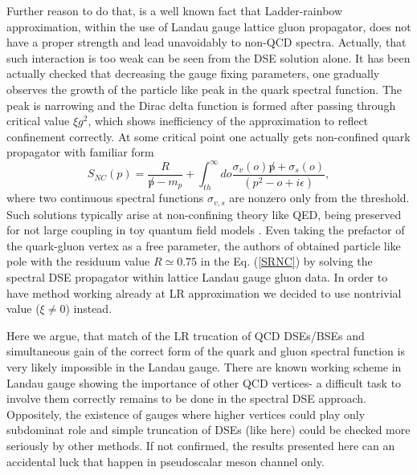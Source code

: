 \documentclass[aps,prd,superscriptaddress,eqsecnum,amsfonts,showpacs,epsfig]{revtex4}
\newcommand{\be}{\begin{equation}}
\newcommand{\ee}{\end{equation}}
\newcommand{\ep}{i\epsilon}
\begin{document}
 Further reason to do that, is a well known fact that Ladder-rainbow approximation, within the use of Landau gauge  lattice gluon propagator,
 does not have a proper strength and lead unavoidably to non-QCD spectra. Actually, that such interaction is too weak   can be  seen  from the DSE solution alone.  It has been actually  checked that  decreasing the gauge  fixing parameters, one gradually observes the growth of the particle like peak in the quark spectral function. The peak is narrowing and the Dirac delta function is formed  after passing through critical value $\xi g^2$, which shows  inefficiency
of  the approximation to reflect confinement correctly.
  At some critical point one actually gets non-confined quark  propagator with familiar form
%
\be \label{SRNC}
S_{NC}(p)=\frac{R}{\not p-m_p}+\int_{th}^{\infty} do \frac{\sigma_v(o)\not p+\sigma_s(o)}{(p^2-o+\ep)}, 
\ee
where two  continuous spectral functions  $\sigma_{v,s}$ are nonzero only from the threshold. 
 Such solutions typically arise at non-confining theory like QED, being 
preserved for not large coupling in toy quantum field models \cite{SAJHP2003}.
Even taking the prefactor of the quark-gluon vertex as a free parameter, the authors of  \cite{HPW2022b}  obtained particle like pole with the residuum value $R\simeq 0.75$ in the Eq. (\ref{SRNC}) by solving the spectral DSE propagator within   lattice Landau gauge gluon data. 
 In order to have method working already at LR approximation  we decided to use nontrivial value ($\xi\ne 0$) instead.


Here we argue, that match of  the LR trucation of QCD DSEs/BSEs  and  simultaneous gain of  the correct form of the quark and gluon spectral function  is very likely impossible in the Landau gauge.  There are known working scheme in  Landau gauge showing the importance of other QCD vertices- a difficult task 
to involve them correctly remains to be done in the  spectral DSE approach.  Oppositely, the existence of gauges where higher vertices  could play only subdominat role  and simple truncation of DSEs (like here) could be checked more seriously by other methods.  If not confirmed, the results  presented here
can an accidental luck that happen in  pseudoscalar meson channel only.
\end{document}

